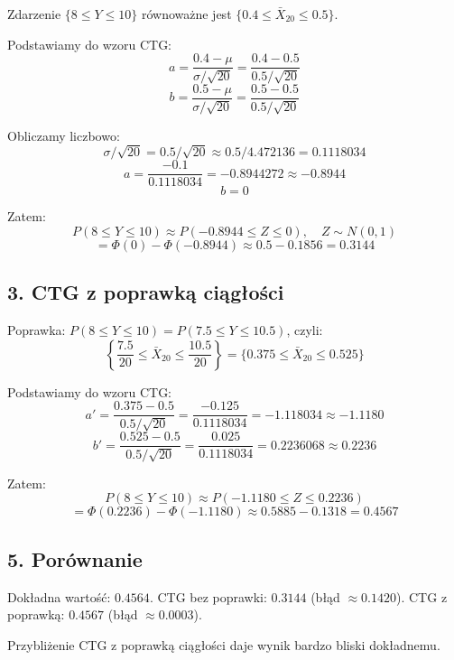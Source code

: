 Zdarzenie \( \{8 \le Y \le 10\} \) równoważne jest \( \{0.4 \le \bar{X}_{20} \le 0.5\} \).

Podstawiamy do wzoru CTG:
\[
	a = \frac{0.4 - \mu}{\sigma/\sqrt{20}} = \frac{0.4 - 0.5}{0.5/\sqrt{20}}
\]
\[
	b = \frac{0.5 - \mu}{\sigma/\sqrt{20}} = \frac{0.5 - 0.5}{0.5/\sqrt{20}}
\]

Obliczamy liczbowo:
\[
	\sigma/\sqrt{20} = 0.5/\sqrt{20} \approx 0.5/4.472136 = 0.1118034
\]
\[
	a = \frac{-0.1}{0.1118034} = -0.8944272 \approx -0.8944
\]
\[
	b = 0
\]

Zatem:
\[
	P(8 \le Y \le 10) \approx P(-0.8944 \le Z \le 0),\quad Z\sim N(0,1)
\]
\[
	= \Phi(0) - \Phi(-0.8944) \approx 0.5 - 0.1856 = 0.3144
\]

\subsection*{3. CTG z poprawką ciągłości}

Poprawka: \( P(8 \le Y \le 10) = P(7.5 \le Y \le 10.5) \), czyli:
\[
	\left\{ \frac{7.5}{20} \le \bar{X}_{20} \le \frac{10.5}{20} \right\} = \{0.375 \le \bar{X}_{20} \le 0.525\}
\]

Podstawiamy do wzoru CTG:
\[
	a' = \frac{0.375 - 0.5}{0.5/\sqrt{20}} = \frac{-0.125}{0.1118034} = -1.118034 \approx -1.1180
\]
\[
	b' = \frac{0.525 - 0.5}{0.5/\sqrt{20}} = \frac{0.025}{0.1118034} = 0.2236068 \approx 0.2236
\]

Zatem:
\[
	P(8 \le Y \le 10) \approx P(-1.1180 \le Z \le 0.2236)
\]
\[
	= \Phi(0.2236) - \Phi(-1.1180) \approx 0.5885 - 0.1318 = 0.4567
\]
\subsection*{5. Porównanie}
Dokładna wartość: \( 0.4564 \).
CTG bez poprawki: \( 0.3144 \) (błąd \( \approx 0.1420 \)).
CTG z poprawką: \( 0.4567 \) (błąd \( \approx 0.0003 \)).

Przybliżenie CTG z poprawką ciągłości daje wynik bardzo bliski dokładnemu.
